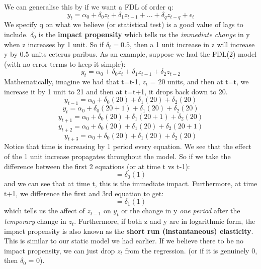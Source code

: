 \documentclass[11pt, oneside]{article}
\theoremstyle{definition}
\begin{document}
We can generalise this by if we want a FDL of order q:
$$
y_t = \alpha_0 + \delta_0 z_t + \delta_1 z_{t-1} + ... + \delta_q z_{t-q} + \epsilon_t
$$
We specify q on what we believe (or statistical test) is a good value of lags to include. $\delta_0$ is the \textbf{impact propensity} which tells us the \textit{immediate change} in y when z increases by 1 unit. So if $\delta_t = 0.5$, then a 1 unit increase in z will increase y by 0.5 units ceterus paribus. As an example, suppose we had the FDL(2) model (with no error terms to keep it simple):
$$
y_{t} = \alpha_0 + \delta_0z_t + \delta_1z_{t-1} + \delta_2z_{t-2}
$$
Mathematically, imagine we had that t=t-1, $z_t$ = 20 units, and then at t=t, we increase it by 1 unit to 21 and then at t=t+1, it drops back down to 20.
$$
y_{t-1} = \alpha_0 + \delta_0 (20) + \delta_1 (20) + \delta_2(20)
$$
$$
y_t = \alpha_0 + \delta_0(20+1) + \delta_1(20) + \delta_2(20)
$$
$$
y_{t+1} = \alpha_0 + \delta_0(20) + \delta_1(20+1) + \delta_2(20)
$$
$$
y_{t+2} = \alpha_0 + \delta_0(20) + \delta_1(20) + \delta_2(20+1)
$$
$$
y_{t+3} = \alpha_0 + \delta_0(20) + \delta_1(20) + \delta_2(20)
$$
Notice that time is increasing by 1 period every equation. We see that the effect of the 1 unit increase propagates throughout the model. So if we take the difference between the first 2 equations (or at time t vs t-1):
$$
= \delta_0(1)
$$
and we can see that at time t, this is the immediate impact. Furthermore, at time t+1, we difference the first and 3rd equation to get:
$$
= \delta_1(1)
$$
which tells us the affect of $z_{t-1}$ on $y_t$ or the change in y \textit{one period} after the \textit{temporary} change in $z_t$. Furthermore, if both z and y are in logarithmic form, the impact propensity is also known as the \textbf{short run (instantaneous) elasticity}. This is similar to our static model we had earlier. If we believe there to be no impact propensity, we can just drop $z_t$ from the regression. (or if it is genuinely 0, then $\delta_0$ = 0).
\end{document}
